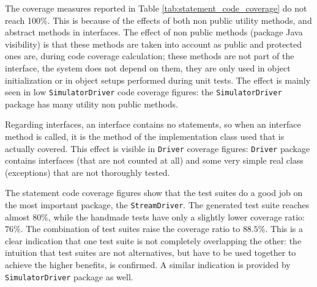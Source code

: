 \documentclass[english]{lni}
\newcommand{\lil}[1]{\texttt{\lstinline|#1|}}
\begin{document}
The coverage measures reported in Table \ref{tab:statement_code_coverage} do not reach 100\%. 
This is because of the effects of both non public utility methods, and abstract methods in interfaces.
The effect of non public methods (package Java visibility) is that these methods are taken into account as public and protected ones are, during code coverage calculation; these methods are not part of the interface, the system does not depend on them, they are only used in object initialization or in object setups performed during unit tests. 
The effect is mainly seen in low \lil{SimulatorDriver} code coverage figures: the \lil{SimulatorDriver} package has many utility non public methods.

Regarding interfaces, an interface contains no statements, so when an interface method is called, it is the method of the implementation class used that is actually covered.
This effect is visible in \lil{Driver} coverage figures: \lil{Driver} package contains interfaces (that are not counted at all) and some very simple real class (exceptions) that are not thoroughly tested. 

The statement code coverage figures show that the test suites do a good job on the most important package, the \lil{StreamDriver}. 
The generated test suite reaches almost $ 80 \% $, while the handmade tests have only a slightly lower coverage ratio: $ 76 \% $. 
The combination of test suites raise the coverage ratio to $ 88.5 \% $. 
This is a clear indication that one test suite is not completely overlapping the other: the intuition that test suites are not alternatives, but have to be used together to achieve the higher benefits, is confirmed.
A similar indication is provided by \lil{SimulatorDriver} package as well.
\end{document}
